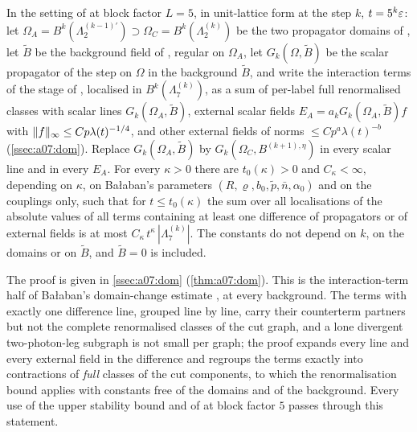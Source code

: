 \begin{lemma}\label{hyp:k01:BALint}
In the setting of \cite[Sect.~2]{Ba2} at block factor $L=5$, in unit-lattice form at the step $k$, $t=5^k\varepsilon$: let $\Omega_A=B^k(\Lambda^{(k-1)\prime}_2)\supset\Omega_C=B^k(\Lambda^{(k)}_2)$ be the two propagator domains of \cite[Prop.~2.6]{Ba2}, let $\tilde B$ be the background field of \cite[p.~579]{Ba2}, regular on $\Omega_A$, let $G_k(\Omega,\tilde B)$ be the scalar propagator of the step on $\Omega$ in the background $\tilde B$, and write the interaction terms of the stage of \cite[p.~579]{Ba2}, localised in $B^k(\Lambda^{(k)}_7)$, as a sum of per-label full renormalised classes with scalar lines $G_k(\Omega_A,\tilde B)$, external scalar fields $E_A=a_kG_k(\Omega_A,\tilde B)f$ with $\lVert f\rVert_\infty\le Cp\lambda(t)^{-1/4}$, and other external fields of norms $\le Cp^a\lambda(t)^{-b}$ (\cref{ssec:a07:dom}). Replace $G_k(\Omega_A,\tilde B)$ by $G_k(\Omega_C,B^{(k+1),\eta})$ in every scalar line and in every $E_A$. For every $\kappa>0$ there are $t_0(\kappa)>0$ and $C_\kappa<\infty$, depending on $\kappa$, on Ba{\l}aban's parameters $(R,\varrho,b_0,\tilde p,\bar n,\alpha_0)$ and on the couplings only, such that for $t\le t_0(\kappa)$ the sum over all localisations of the absolute values of all terms containing at least one difference of propagators or of external fields is at most $C_\kappa\,t^{\kappa}\,|\Lambda^{(k)}_7|$. The constants do not depend on $k$, on the domains or on $\tilde B$, and $\tilde B=0$ is included.
\end{lemma}
The proof is given in \cref{ssec:a07:dom} (\cref{thm:a07:dom}). This is the interaction-term half of Ba{\l}aban's domain-change estimate \cite[Prop.~2.6]{Ba2}, at every background. The terms with exactly one difference line, grouped line by line, carry their counterterm partners but not the complete renormalised classes of the cut graph, and a lone divergent two-photon-leg subgraph is not small per graph; the proof expands every line and every external field in the difference and regroups the terms exactly into contractions of \emph{full} classes of the cut components, to which the renormalisation bound \cite[Prop.~1, (1.33)]{Ba3} applies with constants free of the domains and of the background. Every use of the upper stability bound \cite[(1.3)]{Ba2} and of \cite[Thm.~3.1, (3.4)]{K1} at block factor $5$ passes through this statement.


